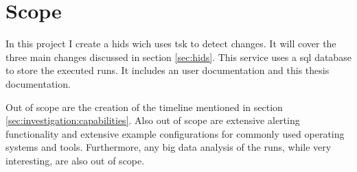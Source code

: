 \section{Scope}

In this project I create a \gls{hids} wich uses \gls{tsk} to detect changes. It will cover the three main changes discussed in section \ref{sec:hids}. This service uses a \gls{sql} database to store the executed runs. It includes an user documentation and this thesis documentation. 

Out of scope are the creation of the timeline mentioned in section \ref{sec:investigation:capabilities}. Also out of scope are extensive alerting functionality and extensive example configurations for commonly used operating systems and tools. Furthermore, any big data analysis of the runs, while very interesting, are also out of scope.

